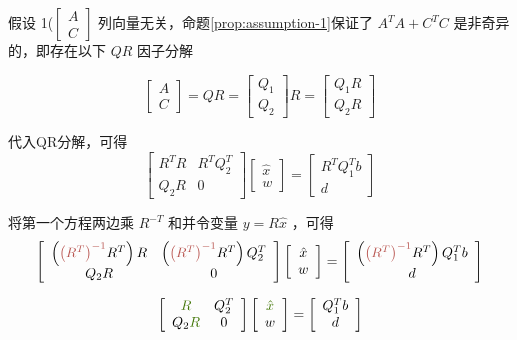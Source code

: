 假设 1($ \left[\begin{array}{l}A \\ C\end{array}\right] $ 列向量无关，命题\ref{prop:assumption-1}保证了 $ A^{T} A+C^{T} C $ 是非奇异的，即存在以下 $ Q R $ 因子分解

$$ \left[\begin{array}{l}A \\ C\end{array}\right]=Q R=\left[\begin{array}{l}Q_{1} \\ Q_{2}\end{array}\right] R=\left[\begin{array}{l}Q_{1} R \\ Q_{2} R\end{array}\right] $$

代入QR分解，可得
$$
\left[\begin{array}{cc}
R^{T} R & R^{T} Q_{2}^{T} \\
Q_{2} R & 0
\end{array}\right]\left[\begin{array}{c}
\hat{x} \\
w
\end{array}\right]=\left[\begin{array}{c}
R^{T} Q_{1}^{T} b \\
d
\end{array}\right]
$$

将第一个方程两边乘 $ R^{-T} $ 和并令变量 $ y=R \hat{x} $ ，可得
$$\displaystyle \left[\begin{array}{ c c }
    \left(\textcolor[rgb]{0.72,0.33,0.31}{\left( R^{T}\right)^{-1}} R^{T}\right) R & \left(\textcolor[rgb]{0.72,0.33,0.31}{\left( R^{T}\right)^{-1}} R^{T}\right) Q_{2}^{T}\\
    Q_{2} R & 0
    \end{array}\right]\left[\begin{array}{ c }
    \hat{x}\\
    w
    \end{array}\right] =\left[\begin{array}{ c }
    \left(\textcolor[rgb]{0.72,0.33,0.31}{\left( R^{T}\right)^{-1}} R^{T}\right) Q_{1}^{T} b\\
    d
    \end{array}\right]$$

$$\displaystyle \left[\begin{array}{ c c }
    \textcolor[rgb]{0.25,0.46,0.02}{R} & Q_{2}^{T}\\
    Q_{2}\textcolor[rgb]{0.25,0.46,0.02}{R} & 0
    \end{array}\right]\left[\begin{array}{ c }
    \textcolor[rgb]{0.25,0.46,0.02}{\hat{x}}\\
    w
    \end{array}\right] =\left[\begin{array}{ c }
    Q_{1}^{T} b\\
    d
    \end{array}\right]$$

